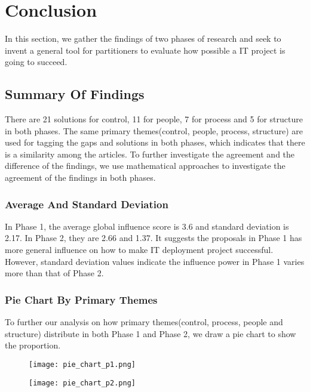 
\section{Conclusion}
In this section, we gather the findings of two phases of research and seek to invent a general tool for partitioners to evaluate how possible a IT project is going to succeed.

\subsection{Summary Of Findings}
There are 21 solutions for control, 11 for people, 7 for process and 5 for structure in both phases. The same primary themes(control, people, process, structure) are used for tagging the gaps and solutions in both phases, which indicates that there is a similarity among the articles. To further investigate the agreement and the difference of the findings, we use mathematical approaches to investigate the agreement of the findings in both phases.

\subsubsection{Average And Standard Deviation}
In Phase 1, the average global influence score is 3.6 and standard deviation
is 2.17. In Phase 2, they are 2.66 and 1.37. It suggests the proposals in Phase 1 has more general influence on how to make IT deployment project successful. However, standard deviation values indicate the influence power in Phase 1 varies more than that of Phase 2.
\subsubsection{Pie Chart By Primary Themes}
To further our analysis on how primary themes(control, process, people and structure) distribute in both Phase 1 and Phase 2, we draw a pie chart to show the proportion.

\begin{figure}[!ht]
\centering
\begin{minipage}{.5\textwidth}
  \centering
  \texttt{[image: pie\_chart\_p1.png]}
  \label{pie:1}
\end{minipage}%
\begin{minipage}{.5\textwidth}
  \centering
  \texttt{[image: pie\_chart\_p2.png]}
  \label{pie:2}
\end{minipage}
\end{figure}

